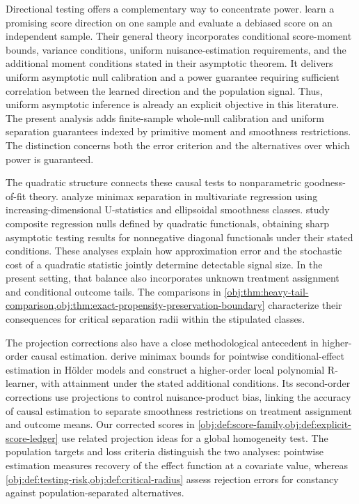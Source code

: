 Directional testing offers a complementary way to concentrate power. \citet[Section 2.2.1, Assumptions 1--5, Theorem 1, and Corollaries 1--2]{DhawanGuoShah2026Directional} learn a promising score direction on one sample and evaluate a debiased score on an independent sample. Their general theory incorporates conditional score-moment bounds, variance conditions, uniform nuisance-estimation requirements, and the additional moment conditions stated in their asymptotic theorem. It delivers uniform asymptotic null calibration and a power guarantee requiring sufficient correlation between the learned direction and the population signal. Thus, uniform asymptotic inference is already an explicit objective in this literature. The present analysis adds finite-sample whole-null calibration and uniform separation guarantees indexed by primitive moment and smoothness restrictions. The distinction concerns both the error criterion and the alternatives over which power is guaranteed.

The quadratic structure connects these causal tests to nonparametric goodness-of-fit theory. \citet[Sections 2--4 and Theorems 1--2]{IngsterSapatinas2009GoodnessOfFit} analyze minimax separation in multivariate regression using increasing-dimensional U-statistics and ellipsoidal smoothness classes. \citet[Sections 2.3--2.4 and Theorems 1--2]{CommingesDalalyan2013QuadraticNull} study composite regression nulls defined by quadratic functionals, obtaining sharp asymptotic testing results for nonnegative diagonal functionals under their stated conditions. These analyses explain how approximation error and the stochastic cost of a quadratic statistic jointly determine detectable signal size. In the present setting, that balance also incorporates unknown treatment assignment and conditional outcome tails. The comparisons in \cref{obj:thm:heavy-tail-comparison,obj:thm:exact-propensity-preservation-boundary} characterize their consequences for critical separation radii within the stipulated classes.

The projection corrections also have a close methodological antecedent in higher-order causal estimation. \citet[Sections 3--4]{KennedyBalakrishnanRobinsWasserman2024MinimaxCATE} derive minimax bounds for pointwise conditional-effect estimation in Hölder models and construct a higher-order local polynomial R-learner, with attainment under the stated additional conditions. Its second-order corrections use projections to control nuisance-product bias, linking the accuracy of causal estimation to separate smoothness restrictions on treatment assignment and outcome means. Our corrected scores in \cref{obj:def:score-family,obj:def:explicit-score-ledger} use related projection ideas for a global homogeneity test. The population targets and loss criteria distinguish the two analyses: pointwise estimation measures recovery of the effect function at a covariate value, whereas \cref{obj:def:testing-risk,obj:def:critical-radius} assess rejection errors for constancy against population-separated alternatives.

